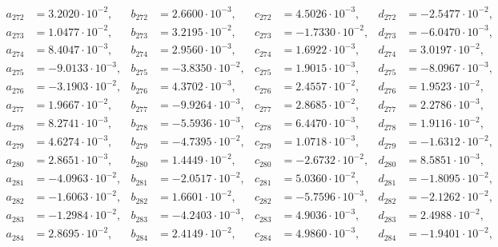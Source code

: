 \begin{align*}
  a_{ 272 } &= 3.2020 \cdot 10^{ -2 }, & b_{ 272 } &= 2.6600 \cdot 10^{ -3 }, & c_{ 272 } &= 4.5026 \cdot 10^{ -3 }, & d_{ 272 } &= -2.5477 \cdot 10^{ -2 }, \\ 
  a_{ 273 } &= 1.0477 \cdot 10^{ -2 }, & b_{ 273 } &= 3.2195 \cdot 10^{ -2 }, & c_{ 273 } &= -1.7330 \cdot 10^{ -2 }, & d_{ 273 } &= -6.0470 \cdot 10^{ -3 }, \\ 
  a_{ 274 } &= 8.4047 \cdot 10^{ -3 }, & b_{ 274 } &= 2.9560 \cdot 10^{ -3 }, & c_{ 274 } &= 1.6922 \cdot 10^{ -3 }, & d_{ 274 } &= 3.0197 \cdot 10^{ -2 }, \\ 
  a_{ 275 } &= -9.0133 \cdot 10^{ -3 }, & b_{ 275 } &= -3.8350 \cdot 10^{ -2 }, & c_{ 275 } &= 1.9015 \cdot 10^{ -3 }, & d_{ 275 } &= -8.0967 \cdot 10^{ -3 }, \\ 
  a_{ 276 } &= -3.1903 \cdot 10^{ -2 }, & b_{ 276 } &= 4.3702 \cdot 10^{ -3 }, & c_{ 276 } &= 2.4557 \cdot 10^{ -2 }, & d_{ 276 } &= 1.9523 \cdot 10^{ -2 }, \\ 
  a_{ 277 } &= 1.9667 \cdot 10^{ -2 }, & b_{ 277 } &= -9.9264 \cdot 10^{ -3 }, & c_{ 277 } &= 2.8685 \cdot 10^{ -2 }, & d_{ 277 } &= 2.2786 \cdot 10^{ -3 }, \\ 
  a_{ 278 } &= 8.2741 \cdot 10^{ -3 }, & b_{ 278 } &= -5.5936 \cdot 10^{ -3 }, & c_{ 278 } &= 6.4470 \cdot 10^{ -3 }, & d_{ 278 } &= 1.9116 \cdot 10^{ -2 }, \\ 
  a_{ 279 } &= 4.6274 \cdot 10^{ -3 }, & b_{ 279 } &= -4.7395 \cdot 10^{ -2 }, & c_{ 279 } &= 1.0718 \cdot 10^{ -3 }, & d_{ 279 } &= -1.6312 \cdot 10^{ -2 }, \\ 
  a_{ 280 } &= 2.8651 \cdot 10^{ -3 }, & b_{ 280 } &= 1.4449 \cdot 10^{ -2 }, & c_{ 280 } &= -2.6732 \cdot 10^{ -2 }, & d_{ 280 } &= 8.5851 \cdot 10^{ -3 }, \\ 
  a_{ 281 } &= -4.0963 \cdot 10^{ -2 }, & b_{ 281 } &= -2.0517 \cdot 10^{ -2 }, & c_{ 281 } &= 5.0360 \cdot 10^{ -2 }, & d_{ 281 } &= -1.8095 \cdot 10^{ -2 }, \\ 
  a_{ 282 } &= -1.6063 \cdot 10^{ -2 }, & b_{ 282 } &= 1.6601 \cdot 10^{ -2 }, & c_{ 282 } &= -5.7596 \cdot 10^{ -3 }, & d_{ 282 } &= -2.1262 \cdot 10^{ -2 }, \\ 
  a_{ 283 } &= -1.2984 \cdot 10^{ -2 }, & b_{ 283 } &= -4.2403 \cdot 10^{ -3 }, & c_{ 283 } &= 4.9036 \cdot 10^{ -3 }, & d_{ 283 } &= 2.4988 \cdot 10^{ -2 }, \\ 
  a_{ 284 } &= 2.8695 \cdot 10^{ -2 }, & b_{ 284 } &= 2.4149 \cdot 10^{ -2 }, & c_{ 284 } &= 4.9860 \cdot 10^{ -3 }, & d_{ 284 } &= -1.9401 \cdot 10^{ -2 }, \\ 

\end{align*}
